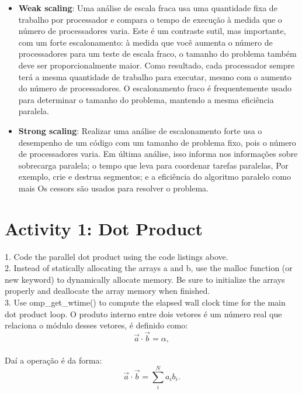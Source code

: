 \documentclass[letterpaper, 10 pt, conference]{ieeeconf}
\begin{document}
\begin{itemize}
    \item \textbf{Weak scaling}: Uma análise de escala fraca usa uma quantidade fixa de trabalho por processador e compara 
    o tempo de execução à medida que o número de processadores varia. Este é um contraste sutil, mas importante, com um 
    forte escalonamento: à medida que você aumenta o número de processadores para um teste de escala fraco, o tamanho do 
    problema também deve ser proporcionalmente maior. Como resultado, cada processador sempre terá a mesma quantidade de 
    trabalho para executar, mesmo com o aumento do número de processadores. O escalonamento fraco é frequentemente usado 
    para determinar o tamanho do problema, mantendo a mesma eficiência paralela.\\
    
    \item \textbf{Strong scaling}: Realizar uma análise de escalonamento forte usa o desempenho de um código com um tamanho de problema fixo, pois o número de processadores varia. Em última análise, isso informa nos informações sobre 
    sobrecarga paralela; o tempo que leva para coordenar tarefas paralelas, Por exemplo, crie e destrua segmentos; e a 
    eficiência do algoritmo paralelo como mais Os cessors são usados para resolver o problema.
\end{itemize}


\section{Activity 1: Dot Product}
1. Code the parallel dot product using the code listings above. \\
2. Instead of statically allocating the arrays a and b, use the malloc function (or new 
keyword) to dynamically allocate 
memory. Be sure to initialize the arrays properly and deallocate the array memory when 
finished. \\
3. Use omp\_get\_wtime() to compute the elapsed wall clock time for the main dot product 
loop. 
\newline
\newline
    O produto interno entre dois vetores é um número real que relaciona o módulo desses 
 vetores, é definido como: 
\begin{equation*} \vec{a}\cdot \vec{b}=\alpha, \end{equation*}\\
Daí a operação é da forma:
\begin{equation*} \vec{a}\cdot\vec{b}=\sum\limits_{i}^{N}a_{i}b_{i}. \end{equation*}\\
\end{document}

